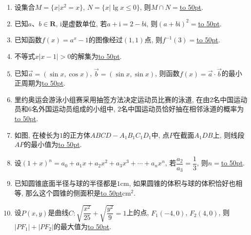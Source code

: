 \documentclass[10pt,a4paper]{article}
\newcommand{\blank}[1]{\underline{\hbox to #1pt{}}}
\begin{document}
\begin{enumerate}[1.]
\item 设集合$M=\{x|x^2=x\}$, $N=\{x|\lg x\le 0\}$, 则$M\cap N=$\blank{50}.
\item 已知$a$、$b\in \mathbf{R}$, $\mathrm{i}$是虚数单位, 若$a+\mathrm{i}=2-b\mathrm{i}$, 则$(a+b\mathrm{i})^2=$\blank{50}.
\item 已知函数$f(x)=a^x-1$的图像经过$(1,1)$点, 则$f^{-1}(3)=$\blank{50}.
\item 不等式$x|x-1|>0$的解集为\blank{50}.
\item 已知$\overrightarrow a=(\sin x,\cos x)$, $\overrightarrow b=(\sin x,\sin x)$, 则函数$f(x)=\overrightarrow a\cdot \overrightarrow b$的最小正周期为\blank{50}.
\item 里约奥运会游泳小组赛采用抽签方法决定运动员比赛的泳道, 在由$2$名中国运动员和$6$名外国运动员组成的小组中, $2$名中国运动员恰好抽在相邻泳道的概率为\blank{50}.
\item 如图, 在棱长为$1$的正方体$ABCD-A_1B_1C_1D_1$中, 点$P$在截面$A_1DB$上, 则线段$AP$的最小值为\blank{50}.
\begin{center}
\end{center}
\item 设$(1+x)^n=a_0+a_1x+a_2x^2+a_3x^3+\cdots +a_nx^n$, 若$\dfrac{a_2}{a_3}=\dfrac13$, 则$n=$\blank{50}.
\item 已知圆锥底面半径与球的半径都是$1\text{cm}$, 如果圆锥的体积与球的体积恰好也相等, 那么这个圆锥的侧面积是\blank{50}$\text{cm}^2$.
\item 设$P(x,y)$是曲线$C:\sqrt{\dfrac{x^2}{25}}+\sqrt{\dfrac{y^2}9}=1$上的点, $F_1(-4,0)$, $F_2(4,0)$, 则$|PF_1|+|PF_2|$的最大值为\blank{50}.



\end{enumerate}
\end{document}

